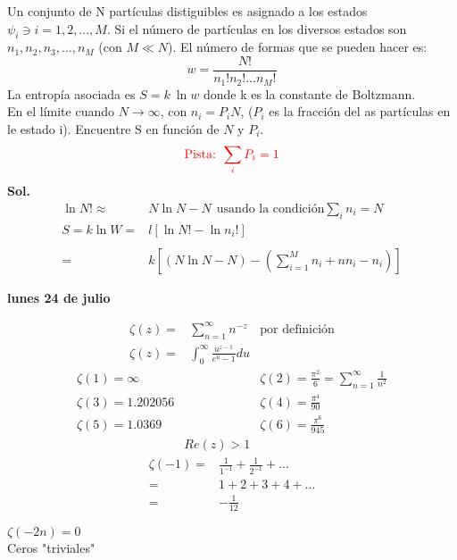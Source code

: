 \documentclass{article}
\theoremstyle{definition}
\begin{document}
Un conjunto de N partículas distiguibles es asignado a los estados $\psi_i\ni i=1,2,...,M$. Si el número de partículas en los diversos estados son $n_1,n_2,n_3,...,n_M$ (con $M\ll N$). El número de formas que se pueden hacer es:
\[w=\frac{N!}{n_1!n_2!...n_M!}\]
La entropía asociada es $S=k\ \ln w$ donde k es la constante de Boltzmann.\\
En el límite cuando $N\to \infty$, con $n_i=P_i N$, ($P_i$ es la fracción del as partículas en le estado i). Encuentre S  en función de $N$ y $P_i$.
\[\textcolor{red}{\text{Pista: } \sum_iP_i=1}\] 
\textbf{Sol. }
\[
\begin{array}{rl}
	\ln N!\approx & N\ln N-N\ \ \text{usando la condición} \sum_in_i=N\\
	S=k\ln W=& l \left[\ln N!- \ln n_i!\right]\\
	\\
	=& k\left[ (N\ln N-N)-\left(\sum^M_{i=1}n_i+nn_i-n_i\right)\right]
\end{array}
\]


\newpage
\textbf{lunes 24 de julio}

\[
\begin{array}{rlr}
	\zeta (z) =& \sum^{\infty}_{n=1} n^{-z} & \text{por definición}\\
	\zeta (z) =& \int^{\infty}_{0}\frac{u^{z-1}}{e^u-1}du
\end{array}
\]
\[
\begin{array}{lcl}
	\zeta (1)=\infty && \zeta (2) =\frac{\pi^2}{6}=\sum^{\infty}_{n=1}\frac{1}{n^2}\\
	\zeta (3) = 1.202056 && \zeta (4)=\frac{\pi^4}{90}\\
	\zeta (5) = 1.0369 &&  \zeta (6) = \frac{\pi^6}{945}\\
	&Re(z)>1
\end{array}
\]
\hfill
\[
\begin{array}{rl}
	\zeta (-1)=& \frac{1}{1^{-1}}+\frac{1}{2^{-1}}+...\\
	=& 1+2+3+4+...\\
	=&-\frac{1}{12}
\end{array}
\]
\begin{center}
	$\zeta(-2n)=0$\\
	Ceros "triviales"
\end{center}
\end{document}
